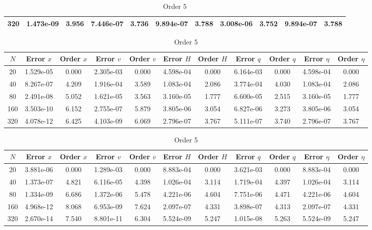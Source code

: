 \documentclass[english]{article}
\theoremstyle{thmstyleone}
\theoremstyle{thmstyletwo}
\theoremstyle{thmstylethree}
\begin{document}
\begin{table}[ht]
\begin{adjustbox}{width=1\textwidth}
\begin{subtable}{1.\linewidth}
\begin{tabular}{ccccccccccc}
				320 & 1.473e-09 & 3.956 & 7.446e-07 & 3.736 & 9.894e-07 & 3.788 & 3.008e-06 & 3.752 & 9.894e-07 & 3.788 \\
				\bottomrule
			\end{tabular}
		\end{subtable}
	\end{adjustbox}
	\begin{adjustbox}{width=1\textwidth}
		\small
		\begin{subtable}{1.\linewidth}
			\centering
			\caption{Order 4}
			\begin{tabular}{ccccccccccc}
				\toprule
				$N$ & Error $x$ & Order $x$ & Error $v$ & Order $v$ & Error $H$ & Order $H$ & Error $q$ & Order $q$ & Error $\eta$ & Order $\eta$ \\
				\midrule
				20 & 1.529e-05 & 0.000 & 2.305e-03 & 0.000 & 4.598e-04 & 0.000 & 6.164e-03 & 0.000 & 4.598e-04 & 0.000 \\
				40 & 8.267e-07 & 4.209 & 1.916e-04 & 3.589 & 1.083e-04 & 2.086 & 3.774e-04 & 4.030 & 1.083e-04 & 2.086 \\
				80 & 2.491e-08 & 5.052 & 1.621e-05 & 3.563 & 3.160e-05 & 1.777 & 6.600e-05 & 2.515 & 3.160e-05 & 1.777 \\
				160 & 3.503e-10 & 6.152 & 2.755e-07 & 5.879 & 3.805e-06 & 3.054 & 6.827e-06 & 3.273 & 3.805e-06 & 3.054 \\
				320 & 4.078e-12 & 6.425 & 4.103e-09 & 6.069 & 2.796e-07 & 3.767 & 5.111e-07 & 3.740 & 2.796e-07 & 3.767 \\
				\bottomrule
			\end{tabular}
		\end{subtable}
	\end{adjustbox}
	\begin{adjustbox}{width=1\textwidth}
		\small
		\begin{subtable}{1.\linewidth}
			\centering
			\caption{Order 5}
			\begin{tabular}{ccccccccccc}
				\toprule
				$N$ & Error $x$ & Order $x$ & Error $v$ & Order $v$ & Error $H$ & Order $H$ & Error $q$ & Order $q$ & Error $\eta$ & Order $\eta$ \\
				\midrule
				20 & 3.881e-06 & 0.000 & 1.289e-03 & 0.000 & 8.883e-04 & 0.000 & 3.621e-03 & 0.000 & 8.883e-04 & 0.000 \\
				40 & 1.373e-07 & 4.821 & 6.116e-05 & 4.398 & 1.026e-04 & 3.114 & 1.719e-04 & 4.397 & 1.026e-04 & 3.114 \\
				80 & 1.334e-09 & 6.686 & 1.372e-06 & 5.478 & 4.221e-06 & 4.604 & 7.751e-06 & 4.471 & 4.221e-06 & 4.604 \\
				160 & 4.968e-12 & 8.068 & 6.953e-09 & 7.624 & 2.097e-07 & 4.331 & 3.898e-07 & 4.313 & 2.097e-07 & 4.331 \\
				320 & 2.670e-14 & 7.540 & 8.801e-11 & 6.304 & 5.524e-09 & 5.247 & 1.015e-08 & 5.263 & 5.524e-09 & 5.247 \\
				\bottomrule
			\end{tabular}
		\end{subtable}
	\end{adjustbox}
\end{table}
\end{document}
